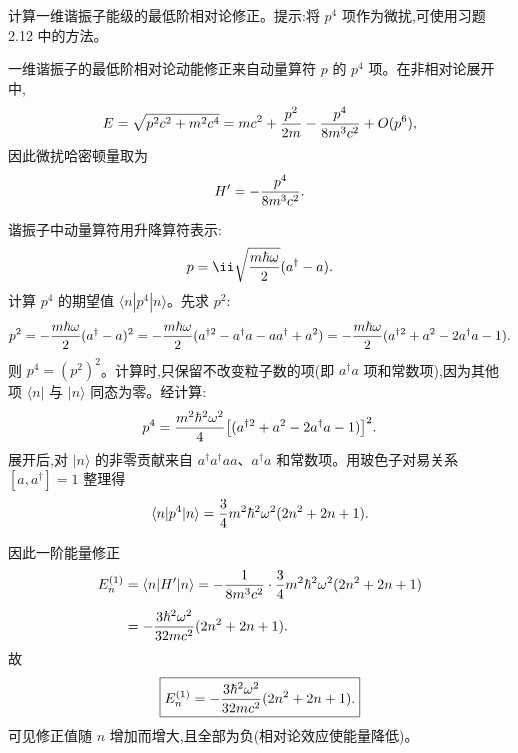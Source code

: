 \begin{question}
计算一维谐振子能级的最低阶相对论修正。提示:将 $p^4$ 项作为微扰,可使用习题 2.12 中的方法。
\begin{solution}
一维谐振子的最低阶相对论动能修正来自动量算符 $p$ 的 $p^4$ 项。在非相对论展开中,
\[
E=\sqrt{p^2c^2+m^2c^4}=mc^2+{p^2\over2m}-{p^4\over8m^3c^2}+O(p^6),
\]
因此微扰哈密顿量取为
\[
H'=-{p^4\over8m^3c^2}.
\]

谐振子中动量算符用升降算符表示:
\[
p=\ii\sqrt{m\hbar\omega\over2}(a^\dagger-a).
\]
计算 $p^4$ 的期望值 $\langle n|p^4|n\rangle$。先求 $p^2$:
\[
p^2=-{m\hbar\omega\over2}(a^\dagger-a)^2
=-{m\hbar\omega\over2}(a^{\dagger2}-a^\dagger a-a a^\dagger+a^2)
=-{m\hbar\omega\over2}(a^{\dagger2}+a^2-2a^\dagger a-1).
\]
则 $p^4=(p^2)^2$。计算时,只保留不改变粒子数的项(即 $a^\dagger a$ 项和常数项),因为其他项 $\langle n|$ 与 $|n\rangle$ 同态为零。经计算:
\[
p^4={m^2\hbar^2\omega^2\over4}\bigl[(a^{\dagger2}+a^2-2a^\dagger a-1)\bigr]^2.
\]
展开后,对 $|n\rangle$ 的非零贡献来自 $a^\dagger a^\dagger a a$、$a^\dagger a$ 和常数项。用玻色子对易关系 $[a,a^\dagger]=1$ 整理得
\[
\langle n|p^4|n\rangle={3\over4}m^2\hbar^2\omega^2(2n^2+2n+1).
\]

因此一阶能量修正
\[
\begin{aligned}
E_n^{(1)}&=\langle n|H'|n\rangle
=-{1\over8m^3c^2}\cdot{3\over4}m^2\hbar^2\omega^2(2n^2+2n+1)\\[4pt]
&=-{3\hbar^2\omega^2\over32mc^2}(2n^2+2n+1).
\end{aligned}
\]
故
\[
\boxed{E_n^{(1)}=-{3\hbar^2\omega^2\over32mc^2}(2n^2+2n+1).}
\]
可见修正值随 $n$ 增加而增大,且全部为负(相对论效应使能量降低)。
\end{solution}
\end{question}

